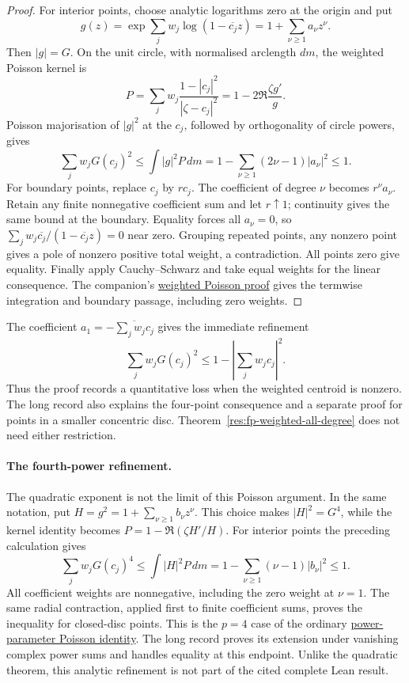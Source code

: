 \documentclass[11pt]{article}
\begin{document}
\begin{proof}
For interior points, choose analytic logarithms zero at the origin and put
\[
 g(z)=\exp\sum_jw_j\log(1-\overline{c_j}z)
     =1+\sum_{\nu\ge1}a_\nu z^\nu.
\]
Then $|g|=G$. On the unit circle, with normalised arclength $dm$,
the weighted Poisson kernel is
\[
 P=\sum_jw_j\frac{1-|c_j|^2}{|\zeta-c_j|^2}
   =1-2\Re\frac{\zeta g'}g.
\]
Poisson majorisation of $|g|^2$ at the $c_j$, followed by orthogonality
of circle powers, gives
\[
 \sum_jw_jG(c_j)^2\le\int |g|^2P\,dm
 =1-\sum_{\nu\ge1}(2\nu-1)|a_\nu|^2\le1.
\]
For boundary points, replace $c_j$ by $rc_j$. The coefficient of degree
$\nu$ becomes $r^\nu a_\nu$. Retain any finite nonnegative coefficient
sum and let $r\uparrow1$; continuity gives the same bound at the boundary.
Equality forces all $a_\nu=0$, so
$\sum_jw_j\overline{c_j}/(1-\overline{c_j}z)=0$ near zero.
Grouping repeated points, any nonzero point gives a pole of nonzero
positive total weight, a contradiction. All points zero give equality.
Finally apply Cauchy--Schwarz and take equal weights for the linear
consequence. The companion's
\href{erdos1041-lemniscate-reasoning-surface.pdf\#weighted-poisson-proof}{weighted Poisson proof}
gives the termwise integration and boundary passage, including zero weights.
\end{proof}

The coefficient $a_1=-\overline{\sum_jw_jc_j}$ gives the immediate refinement
\[
 \sum_jw_jG(c_j)^2\le1-\left|\sum_jw_jc_j\right|^2.
\]
Thus the proof records a quantitative loss when the weighted centroid is nonzero.
The long record also explains the four-point consequence and a separate
proof for points in a smaller concentric disc. Theorem~\ref{res:fp-weighted-all-degree}
does not need either restriction.

\paragraph{The fourth-power refinement.}
The quadratic exponent is not the limit of this Poisson argument.
In the same notation, put $H=g^2=1+\sum_{\nu\ge1}b_\nu z^\nu$.
This choice makes $|H|^2=G^4$, while the kernel identity becomes
$P=1-\Re(\zeta H'/H)$. For interior points the preceding calculation gives
\[
 \sum_jw_jG(c_j)^4
 \le\int |H|^2P\,dm
 =1-\sum_{\nu\ge1}(\nu-1)|b_\nu|^2\le1.
\]
All coefficient weights are nonnegative, including the zero weight at
$\nu=1$. The same radial contraction, applied first to finite coefficient
sums, proves the inequality for closed-disc points. This is the
$p=4$ case of the ordinary
\href{https://github.com/wcook04/plectis-erdos/blob/f36a98bf3d3e6f65f1074e3b800e3293d5b8a51a/ErdosProblems/Erdos1041/SharpPowerDiscProducts.md}{power-parameter Poisson identity}.
The long record proves its extension under vanishing complex power sums
and handles equality at this endpoint. Unlike the quadratic theorem,
this analytic refinement is not part of the cited complete Lean result.
\end{document}
